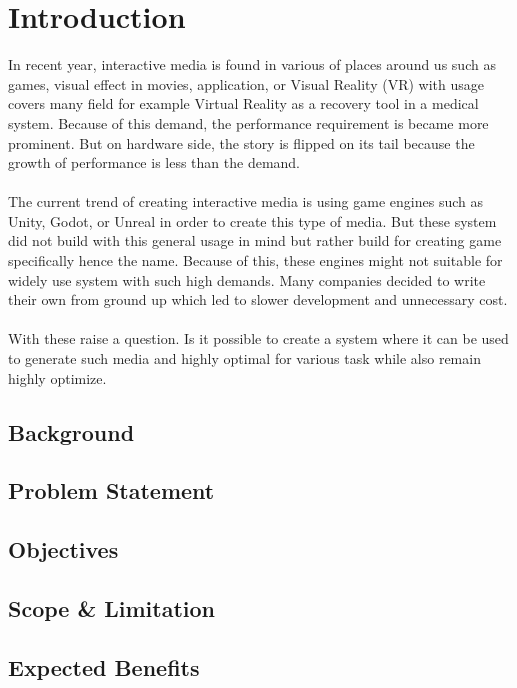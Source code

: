 \section{Introduction}
\label{sec:introduction}
In recent year, interactive media is found in various of places around us
such as games, visual effect in movies, application, or Visual Reality (VR)
with usage covers many field for example Virtual Reality as a recovery tool in a
medical system.
Because of this demand, the performance requirement is became more prominent.
But on hardware side, the story is flipped on its tail because the growth of performance
is less than the demand.
\\\\
The current trend of creating interactive media is using game engines such as Unity, Godot, or
Unreal in order to create this type of media.
But these system did not build with this general usage in mind but rather build for creating
game specifically hence the name.
Because of this, these engines might not suitable for widely use system with such high demands.
Many companies decided to write their own from ground up which led to slower development and
unnecessary cost.
\\\\
With these raise a question.
Is it possible to create a system where it can be used to generate such media and highly optimal
for various task while also remain highly optimize.

\subsection{Background}
\label{subsec:background}

\subsection{Problem Statement}
\label{subsec:problem-statement}

\subsection{Objectives}
\label{subsec:objectives}

\subsection{Scope \& Limitation}
\label{subsec:scope-and-limitation}

\subsection{Expected Benefits}
\label{subsec:expected-benefits}